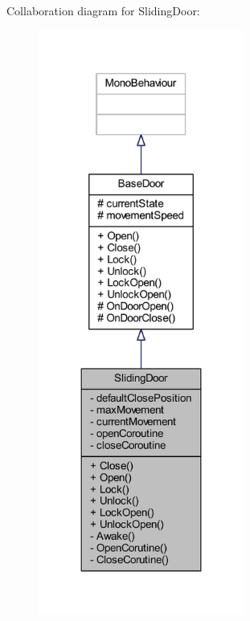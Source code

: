 Collaboration diagram for Sliding\+Door\+:\nopagebreak
\begin{figure}[H]
\begin{center}
\leavevmode
\includegraphics[width=191pt]{class_sliding_door__coll__graph}
\end{center}
\end{figure}
